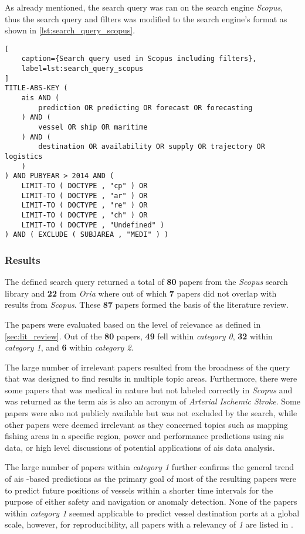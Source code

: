 As already mentioned, the search query was ran on the search engine \textit{Scopus}, thus the search query and filters was modified to the search engine's format as shown in \cref{lst:search_query_scopus}.

\begin{lstlisting}[
    caption={Search query used in Scopus including filters},
    label=lst:search_query_scopus
]
TITLE-ABS-KEY (
    ais AND (
        prediction OR predicting OR forecast OR forecasting
    ) AND (
        vessel OR ship OR maritime
    ) AND (
        destination OR availability OR supply OR trajectory OR logistics
    )
) AND PUBYEAR > 2014 AND (
    LIMIT-TO ( DOCTYPE , "cp" ) OR
    LIMIT-TO ( DOCTYPE , "ar" ) OR
    LIMIT-TO ( DOCTYPE , "re" ) OR
    LIMIT-TO ( DOCTYPE , "ch" ) OR
    LIMIT-TO ( DOCTYPE , "Undefined" )
) AND ( EXCLUDE ( SUBJAREA , "MEDI" ) )
\end{lstlisting}

\subsubsection{Results}

The defined search query returned a total of \textbf{80} papers from the \textit{Scopus} search library and \textbf{22} from \textit{Oria} where out of which \textbf{7} papers did not overlap with results from \textit{Scopus}. These \textbf{87} papers formed the basis of the literature review.

The papers were evaluated based on the level of relevance as defined in \cref{sec:lit_review}. Out of the \textbf{80} papers, \textbf{49} fell within \textit{category 0}, \textbf{32} within \textit{category 1}, and \textbf{6} within \textit{category 2}.

The large number of irrelevant papers resulted from the broadness of the query that was designed to find results in multiple topic areas. Furthermore, there were some papers that was medical in nature but not labeled correctly in \textit{Scopus} and was returned as the term \acrshort{ais} is also an acronym of \textit{Arterial Ischemic Stroke}. Some papers were also not publicly available but was not excluded by the search, while other papers were deemed irrelevant as they concerned topics such as mapping fishing areas in a specific region, power and performance predictions using \acrshort{ais} data, or high level discussions of potential applications of \acrshort{ais} data analysis.

The large number of papers within \textit{category 1} further confirms the general trend of \acrshort{ais} -based predictions as the primary goal of most of the resulting papers were to predict future positions of vessels within a shorter time intervals for the purpose of either safety and navigation or anomaly detection. None of the papers within \textit{category 1} seemed applicable to predict vessel destination ports at a global scale, however, for reproducibility, all papers with a relevancy of \textit{1} are listed in .

